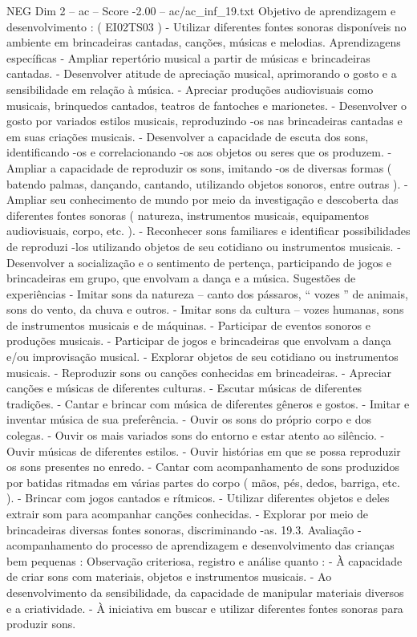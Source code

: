 \begin{textsample}{NEG Dim 2 – ac – Score -2.00 – ac/ac\_inf\_19.txt}
Objetivo de aprendizagem e desenvolvimento : ( EI02TS03 ) - Utilizar diferentes fontes sonoras disponíveis no ambiente em brincadeiras cantadas, canções, músicas e melodias.
Aprendizagens específicas - Ampliar repertório musical a partir de músicas e brincadeiras cantadas. - Desenvolver atitude de apreciação musical, aprimorando o gosto e a sensibilidade em relação à música. - Apreciar produções audiovisuais como musicais, brinquedos cantados, teatros de fantoches e marionetes. - Desenvolver o gosto por variados estilos musicais, reproduzindo -os nas brincadeiras cantadas e em suas criações musicais. - Desenvolver a capacidade de escuta dos sons, identificando -os e correlacionando -os aos objetos ou seres que os produzem. - Ampliar a capacidade de reproduzir os sons, imitando -os de diversas formas ( batendo palmas, dançando, cantando, utilizando objetos sonoros, entre outras ). - Ampliar seu conhecimento de mundo por meio da investigação e descoberta das diferentes fontes sonoras ( natureza, instrumentos musicais, equipamentos audiovisuais, corpo, etc. ). - Reconhecer sons familiares e identificar possibilidades de reproduzi -los utilizando objetos de seu cotidiano ou instrumentos musicais. - Desenvolver a socialização e o sentimento de pertença, participando de jogos e brincadeiras em grupo, que envolvam a dança e a música.
Sugestões de experiências - Imitar sons da natureza – canto dos pássaros, “ vozes ” de animais, sons do vento, da chuva e outros. - Imitar sons da cultura – vozes humanas, sons de instrumentos musicais e de máquinas. - Participar de eventos sonoros e produções musicais. - Participar de jogos e brincadeiras que envolvam a dança e/ou improvisação musical. - Explorar objetos de seu cotidiano ou instrumentos musicais. - Reproduzir sons ou canções conhecidas em brincadeiras. - Apreciar canções e músicas de diferentes culturas. - Escutar músicas de diferentes tradições. - Cantar e brincar com música de diferentes gêneros e gostos. - Imitar e inventar música de sua preferência. - Ouvir os sons do próprio corpo e dos colegas. - Ouvir os mais variados sons do entorno e estar atento ao silêncio. - Ouvir músicas de diferentes estilos. - Ouvir histórias em que se possa reproduzir os sons presentes no enredo. - Cantar com acompanhamento de sons produzidos por batidas ritmadas em várias partes do corpo ( mãos, pés, dedos, barriga, etc. ). - Brincar com jogos cantados e rítmicos. - Utilizar diferentes objetos e deles extrair som para acompanhar canções conhecidas. - Explorar por meio de brincadeiras diversas fontes sonoras, discriminando -as. 19.3.
Avaliação - acompanhamento do processo de aprendizagem e desenvolvimento das crianças bem pequenas : Observação criteriosa, registro e análise quanto : - À capacidade de criar sons com materiais, objetos e instrumentos musicais. - Ao desenvolvimento da sensibilidade, da capacidade de manipular materiais diversos e a criatividade. - À iniciativa em buscar e utilizar diferentes fontes sonoras para produzir sons.

\end{textsample}
